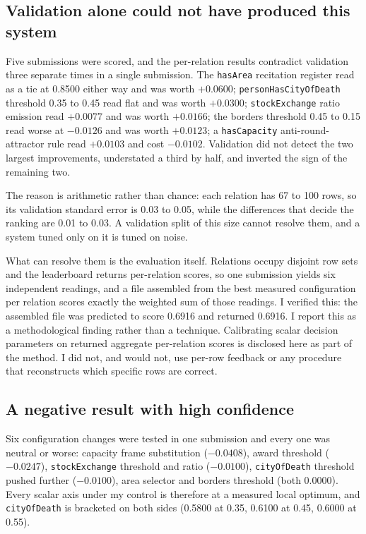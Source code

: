 \documentclass[11pt]{article}
\begin{document}
\subsection{Validation alone could not have produced this system}

Five submissions were scored, and the per-relation results contradict validation
three separate times in a single submission. The \texttt{hasArea} recitation
register read as a tie at 0.8500 either way and was worth $+0.0600$;
\texttt{personHasCityOfDeath} threshold 0.35 to 0.45 read flat and was worth
$+0.0300$; \texttt{stockExchange} ratio emission read $+0.0077$ and was worth
$+0.0166$; the borders threshold 0.45 to 0.15 read worse at $-0.0126$ and was
worth $+0.0123$; a \texttt{hasCapacity} anti-round-attractor rule read $+0.0103$
and cost $-0.0102$. Validation did not detect the two largest improvements,
understated a third by half, and inverted the sign of the remaining two.

The reason is arithmetic rather than chance: each relation has 67 to 100 rows, so
its validation standard error is 0.03 to 0.05, while the differences that decide
the ranking are 0.01 to 0.03. A validation split of this size cannot resolve
them, and a system tuned only on it is tuned on noise.

What can resolve them is the evaluation itself. Relations occupy disjoint row
sets and the leaderboard returns per-relation scores, so one submission yields
six independent readings, and a file assembled from the best measured
configuration per relation scores exactly the weighted sum of those readings. I
verified this: the assembled file was predicted to score 0.6916 and returned
0.6916. I report this as a methodological finding rather than a technique.
Calibrating scalar decision parameters on returned aggregate per-relation scores
is disclosed here as part of the method. I did not, and would not, use per-row
feedback or any procedure that reconstructs which specific rows are correct.

\subsection{A negative result with high confidence}

Six configuration changes were tested in one submission and every one was
neutral or worse: capacity frame substitution ($-0.0408$), award threshold
($-0.0247$), \texttt{stockExchange} threshold and ratio ($-0.0100$),
\texttt{cityOfDeath} threshold pushed further ($-0.0100$), area selector and
borders threshold (both 0.0000). Every scalar axis under my control is therefore
at a measured local optimum, and \texttt{cityOfDeath} is bracketed on both sides
(0.5800 at 0.35, 0.6100 at 0.45, 0.6000 at 0.55).
\end{document}
